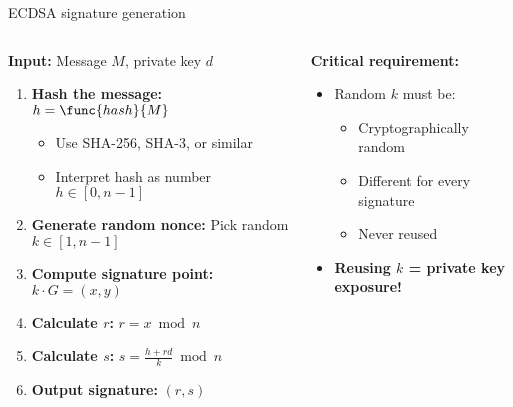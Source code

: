 \documentclass[aspectratio=169, lualatex, handout]{beamer}
\begin{document}
\begin{frame}{ECDSA signature generation}
	\begin{columns}
		\begin{column}{0.6\textwidth}
			\textbf{Input:} Message $M$, private key $d$
			\begin{enumerate}
				\item \textbf{Hash the message:} $h = \func{hash}{M}$
				      \begin{itemize}
					      \item Use SHA-256, SHA-3, or similar
					      \item Interpret hash as number $h \in [0, n-1]$
				      \end{itemize}
				\item \textbf{Generate random nonce:} Pick random $k \in [1, n-1]$
				\item \textbf{Compute signature point:} $k \cdot G = (x, y)$
				\item \textbf{Calculate $r$:} $r = x \bmod n$
				\item \textbf{Calculate $s$:} $s = \frac{h + rd}{k} \bmod n$
				\item \textbf{Output signature:} $(r, s)$
			\end{enumerate}
		\end{column}
		\begin{column}{0.4\textwidth}
			\textbf{Critical requirement:}
			\begin{itemize}
				\item Random $k$ must be:
				      \begin{itemize}
					      \item Cryptographically random
					      \item Different for every signature
					      \item Never reused
				      \end{itemize}
				\item \textbf{Reusing $k$ = private key exposure!}
			\end{itemize}
		\end{column}
	\end{columns}
\end{frame}
\end{document}
